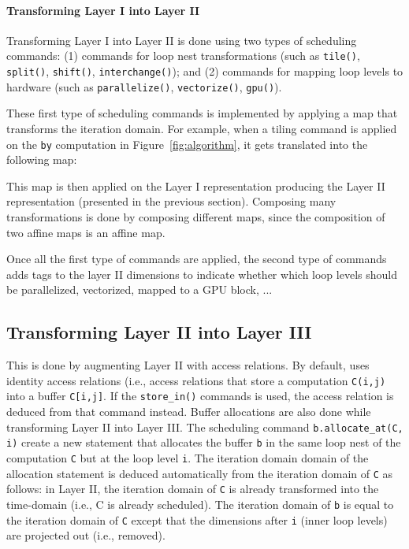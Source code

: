 \paragraph{Transforming Layer I into Layer II}
Transforming Layer I into Layer II is done using two types of scheduling commands: (1) commands for loop nest transformations (such as \texttt{tile()}, \texttt{split()}, \texttt{shift()}, \texttt{interchange()}); and (2) commands for mapping loop levels to hardware (such as \texttt{parallelize()}, \texttt{vectorize()}, \texttt{gpu()}).

These first type of scheduling commands is implemented by applying a map that transforms the iteration domain.  For example, when a tiling command is applied on the \texttt{by} computation in Figure~\ref{fig:algorithm}, it gets translated into the following map:

\centerline{}
\centerline{}

This map is then applied on the Layer I representation producing the Layer II representation (presented in the previous section). Composing many transformations is done by composing different maps, since the composition of two affine maps is an affine map.

Once all the first type of commands are applied, the second type of commands adds \processor tags to the layer II dimensions to indicate whether which loop levels should be parallelized, vectorized, mapped to a GPU block, ...

\subsection{Transforming Layer II into Layer III}
This is done by augmenting Layer II with access relations.  By default, \framework{} uses identity access relations (i.e., access relations that store a computation \texttt{C(i,j)} into a buffer \texttt{C[i,j]}.  If the \texttt{store\_in()} commands is used, the access relation is deduced from that command instead.  Buffer allocations are also done while transforming Layer II into Layer III. The scheduling command \texttt{b.allocate\_at(C, i)} create a new statement that allocates the buffer \texttt{b} in the same loop nest of the computation \texttt{C} but at the loop level \texttt{i}.
The iteration domain domain of the allocation statement is deduced automatically from the iteration domain of \texttt{C} as follows: in Layer II, the iteration domain of \texttt{C} is already transformed into the time-\processor domain (i.e., C is already scheduled).  The iteration domain of \texttt{b} is equal to the iteration domain of \texttt{C} except that the dimensions after \texttt{i} (inner loop levels) are projected out (i.e., removed).

